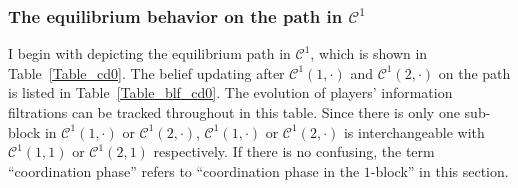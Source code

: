 \documentclass[12pt,letter]{article}
\newcommand{\Kappa}{\mathcal{C}}
\theoremstyle{definition}
\theoremstyle{remark}
\theoremstyle{claim}
\begin{document}
\subsubsection{The equilibrium behavior on the path in $\Kappa^1$}
\label{sec:cd0}
I begin with depicting the equilibrium path in $\Kappa^1$, which is shown in Table~\ref{Table_cd0}. The belief updating after $\Kappa^1(1,\cdot)$ and $\Kappa^1(2,\cdot)$ on the path is listed in Table~\ref{Table_blf_cd0}. The evolution of players' information filtrations can be tracked throughout in this table. Since there is only one sub-block in $\Kappa^1(1,\cdot)$ or $\Kappa^1(2,\cdot)$, $\Kappa^1(1,\cdot)$ or $\Kappa^1(2,\cdot)$ is interchangeable with $\Kappa^1(1,1)$ or $\Kappa^1(2,1)$ respectively. If there is no confusing, the term ``coordination phase'' refers to ``coordination phase in the $1$-block'' in this section.
\end{document}
